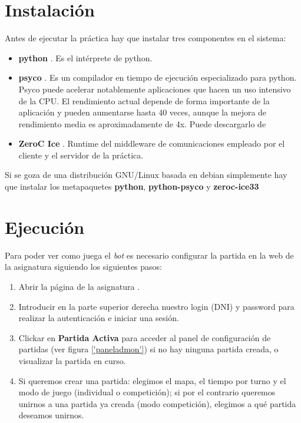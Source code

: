 \section {Instalación}
Antes de ejecutar la práctica hay que instalar tres componentes en el
sistema:
\begin{itemize}
\item \textbf{python} \cite{python}. Es el intérprete de python.
\item \textbf{psyco} \cite{psyco}. Es un compilador en tiempo de ejecución
  especializado para python. Psyco puede acelerar notablemente
  aplicaciones que hacen un uso intensivo de la CPU. El rendimiento
  actual depende de forma importante de la aplicación y pueden
  aumentarse hasta 40 veces, aunque la mejora de rendimiento media es
  aproximadamente de 4x. Puede descargarlo de 
\item \textbf{ZeroC Ice} \cite{zeroc}. Runtime del middleware de comunicaciones
  empleado por el cliente y el servidor de la práctica.
\end{itemize}
Si se goza de una distribución GNU/Linux basada en debian
simplemente hay que instalar los metapaquetes \textbf{python},
\textbf{python-psyco} y \textbf{zeroc-ice33}

\section {Ejecución}
Para poder ver como juega el \emph{bot} es necesario configurar la
partida en la web de la asignatura \cite{webia} siguiendo los
siguientes pasos:
\begin{enumerate}
\item Abrir la página de la asignatura \cite{webia}.
\item Introducir en la parte superior derecha nuestro login (DNI) y
  password para realizar la autenticación e iniciar una sesión.
\item Clickar en \textbf{Partida Activa} para acceder al panel de
  configuración de partidas (ver figura \ref{'paneladmon'}) si no hay ninguna partida creada, o
  visualizar la partida en curso.
\item Si queremos crear una partida: elegimos el mapa, el tiempo por
  turno y el modo de juego (individual o competición); si por el
  contrario queremos unirnos a una partida ya creada (modo
  competición), elegimos a qué partida deseamos unirnos.
\end{enumerate}


